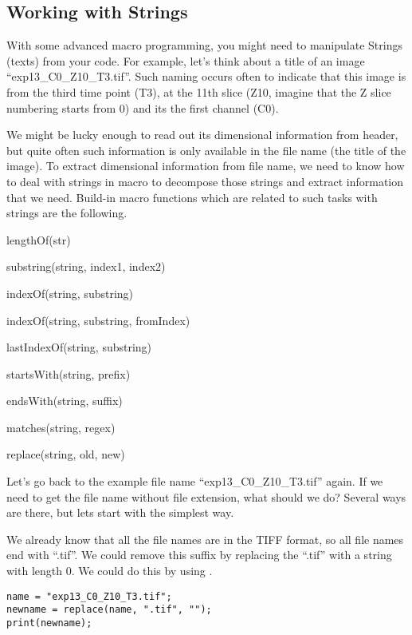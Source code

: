 \subsection{Working with Strings}

With some advanced macro programming, you might need to manipulate Strings (texts) from your code. For example, let's think about a title of an image ``exp13\_C0\_Z10\_T3.tif''. Such naming occurs often to indicate that this image is from the third time point (T3), at the 11th slice (Z10, imagine that the Z slice numbering starts from 0) and its the first channel (C0). 

We might be lucky enough to read out its dimensional information from header, but quite often such information is only available in the file name (the title of the image). To extract dimensional information from file name, we need to know how to deal with strings in macro to decompose those strings and extract information that we need. Build-in macro functions which are related to such tasks with strings are the following. 

\begin{shaded}\begin{indentCom}
\item lengthOf(str)
\item substring(string, index1, index2)
\item indexOf(string, substring)
\item indexOf(string, substring, fromIndex)
\item lastIndexOf(string, substring)
\item startsWith(string, prefix)
\item endsWith(string, suffix)
\item matches(string, regex)
\item replace(string, old, new)
\end{indentCom}\end{shaded}

Let's go back to the example file name ``exp13\_C0\_Z10\_T3.tif'' again. If we need to get the file name without file extension, what should we do? Several ways are there, but lets start with the simplest way. 

We already know that all the file names are in the TIFF format, so all file names end with ``.tif''.  We could remove this suffix by replacing the ``.tif'' with a string with length 0. We could do this by using . 

\begin{lstlisting}
name = "exp13_C0_Z10_T3.tif";
newname = replace(name, ".tif", "");
print(newname);
\end{lstlisting}

